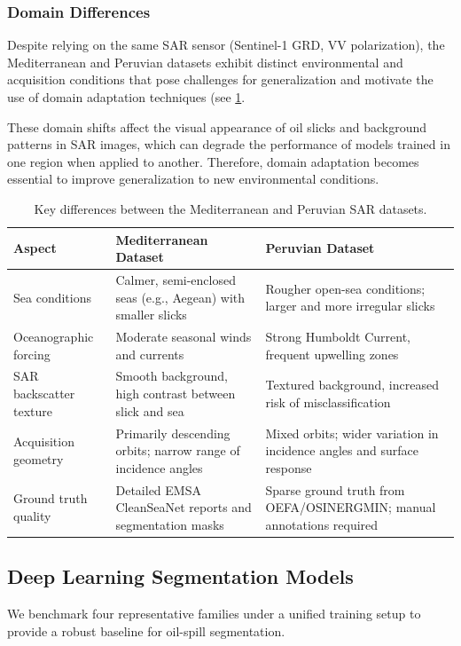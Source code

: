 \documentclass[12pt]{article}
\begin{document}
\subsubsection{Domain Differences}
Despite relying on the same SAR sensor (Sentinel-1 GRD, VV polarization), the Mediterranean and Peruvian datasets exhibit distinct environmental and acquisition conditions that pose challenges for generalization and motivate the use of domain adaptation techniques (see \ref{tab:domain_differences}.

These domain shifts affect the visual appearance of oil slicks and background patterns in SAR images, which can degrade the performance of models trained in one region when applied to another. Therefore, domain adaptation becomes essential to improve generalization to new environmental conditions.

\begin{table}[ht]
\centering
\caption{Key differences between the Mediterranean and Peruvian SAR datasets.}
\begin{tabular}{|p{3.5cm}|p{5.2cm}|p{5.2cm}|}
\hline
\textbf{Aspect} & \textbf{Mediterranean Dataset} & \textbf{Peruvian Dataset} \\
\hline
Sea conditions & Calmer, semi-enclosed seas (e.g., Aegean) with smaller slicks & Rougher open-sea conditions; larger and more irregular slicks \\
\hline
Oceanographic forcing & Moderate seasonal winds and currents & Strong Humboldt Current, frequent upwelling zones \\
\hline
SAR backscatter texture & Smooth background, high contrast between slick and sea & Textured background, increased risk of misclassification \\
\hline
Acquisition geometry & Primarily descending orbits; narrow range of incidence angles & Mixed orbits; wider variation in incidence angles and surface response \\
\hline
Ground truth quality & Detailed EMSA CleanSeaNet reports and segmentation masks & Sparse ground truth from OEFA/OSINERGMIN; manual annotations required \\
\hline
\end{tabular}
\label{tab:domain_differences}
\end{table}
\clearpage

\subsection{Deep Learning Segmentation Models} 
We benchmark four representative families under a unified training setup to provide a robust baseline for oil-spill segmentation.
\end{document}
